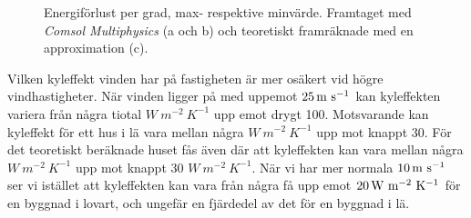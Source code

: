 \begin{figure}[hpbt]
\centering
{}
\vspace{5mm}


\caption{\label{fig:windenergyloss}Energiförlust per grad, max- respektive minvärde.
Framtaget med \emph{Comsol Multiphysics} (a och b) och teoretiskt framräknade med en approximation (c).}
\end{figure}

Vilken kyleffekt vinden har på fastigheten är mer osäkert vid högre vindhastigheter. När vinden
 ligger på med uppemot $\unit[25]{m~s^{-1}}$ kan kyleffekten variera från några tiotal $\unit{W~m^{-2}~K^{-1}}$ upp 
 emot drygt 100. Motsvarande kan kyleffekt för ett hus i lä vara mellan några $\unit{W~m^{-2}~K^{-1}}$ upp mot knappt 30. För det teoretiskt beräknade huset fås även där att kyleffekten 
 kan vara mellan några $\unit{W~m^{-2}~K^{-1}}$ upp mot knappt 30 $\unit{W~m^{-2}~K^{-1}}$. När vi har mer normala $\unit[10]{m~s^{-1}}$ ser vi istället att kyleffekten kan vara från några få upp emot $\unit[20]{W~m^{-2}~K^{-1}}$ för en byggnad i 
 lovart, och ungefär en fjärdedel av det för en byggnad i lä.
 
